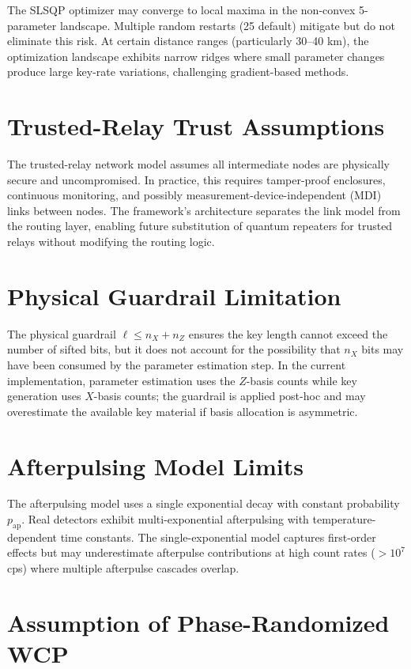 \documentclass[11pt,a4paper,oneside]{report}
\begin{document}
The SLSQP optimizer may converge to local maxima in the non-convex 5-parameter landscape. Multiple random restarts (25 default) mitigate but do not eliminate this risk. At certain distance ranges (particularly 30–40 km), the optimization landscape exhibits narrow ridges where small parameter changes produce large key-rate variations, challenging gradient-based methods.

\section{Trusted-Relay Trust Assumptions}

The trusted-relay network model assumes all intermediate nodes are physically secure and uncompromised. In practice, this requires tamper-proof enclosures, continuous monitoring, and possibly measurement-device-independent (MDI) links between nodes. The framework's architecture separates the link model from the routing layer, enabling future substitution of quantum repeaters for trusted relays without modifying the routing logic.

\section{Physical Guardrail Limitation}

The physical guardrail $\ell \leq n_X + n_Z$ ensures the key length cannot exceed the number of sifted bits, but it does not account for the possibility that $n_X$ bits may have been consumed by the parameter estimation step. In the current implementation, parameter estimation uses the $Z$-basis counts while key generation uses $X$-basis counts; the guardrail is applied post-hoc and may overestimate the available key material if basis allocation is asymmetric.

\section{Afterpulsing Model Limits}

The afterpulsing model uses a single exponential decay with constant probability $p_{\text{ap}}$. Real detectors exhibit multi-exponential afterpulsing with temperature-dependent time constants. The single-exponential model captures first-order effects but may underestimate afterpulse contributions at high count rates ($> 10^7$ cps) where multiple afterpulse cascades overlap.

\section{Assumption of Phase-Randomized WCP}
\end{document}
